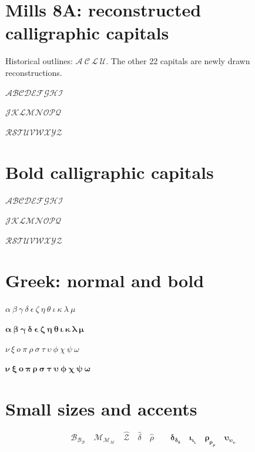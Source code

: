 \documentclass[11pt]{article}
\begin{document}
\section*{Mills 8A: reconstructed calligraphic capitals}
Historical outlines: $\mathcal{A\ C\ L\ U}$.
The other 22 capitals are newly drawn reconstructions.

\bigskip
{\fontsize{28}{42}\selectfont
\(\mathcal{A B C D E F G H I}\)\par
\(\mathcal{J K L M N O P Q}\)\par
\(\mathcal{R S T U V W X Y Z}\)\par}

\section*{Bold calligraphic capitals}
{\fontsize{28}{42}\selectfont
\(\boldsymbol{\mathcal{A B C D E F G H I}}\)\par
\(\boldsymbol{\mathcal{J K L M N O P Q}}\)\par
\(\boldsymbol{\mathcal{R S T U V W X Y Z}}\)\par}

\section*{Greek: normal and bold}
{\fontsize{22}{32}\selectfont
\(\alpha\ \beta\ \gamma\ \delta\ \epsilon\ \zeta\ \eta\ \theta\ \iota\ \kappa\ \lambda\ \mu\)\par
\(\boldsymbol{\alpha\ \beta\ \gamma\ \delta\ \epsilon\ \zeta\ \eta\ \theta\ \iota\ \kappa\ \lambda\ \mu}\)\par
\(\nu\ \xi\ o\ \pi\ \rho\ \sigma\ \tau\ \upsilon\ \phi\ \chi\ \psi\ \omega\)\par
\(\boldsymbol{\nu\ \xi\ o\ \pi\ \rho\ \sigma\ \tau\ \upsilon\ \phi\ \chi\ \psi\ \omega}\)\par}

\section*{Small sizes and accents}
\[
  \mathcal{B}_{\mathcal{B}_{\mathcal{B}}}
  \quad \mathcal{M}_{\mathcal{M}_{\mathcal{M}}}
  \quad \widehat{\mathcal{Z}}\quad\hat\delta\quad\hat\rho
  \qquad
  \boldsymbol{\delta_{\delta_\delta}\quad\iota_{\iota_\iota}
    \quad\rho_{\rho_\rho}\quad\upsilon_{\upsilon_\upsilon}}
\]
\end{document}
